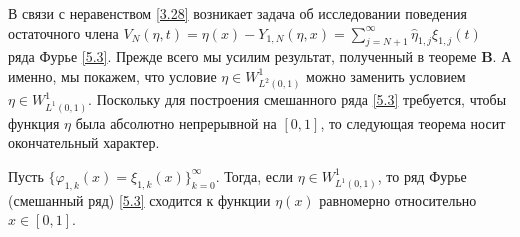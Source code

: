  В связи с неравенством \eqref{3.28} возникает задача об исследовании поведения остаточного члена $ V_N(\eta,t)=\eta(x)- Y_{1,N}(\eta,x)
=\sum\nolimits_{j=N+1}^\infty \hat \eta_{1,j}\xi_{1,j}(t)$  ряда Фурье \eqref{5.3}. Прежде всего мы усилим результат, полученный в теореме \textbf{ B}. А именно, мы покажем, что  условие $\eta\in W^1_{L^2(0,1)}$ можно заменить условием $\eta\in W^1_{L^1(0,1)}$. Поскольку для построения смешанного ряда \eqref{5.3} требуется, чтобы функция $\eta$ была абсолютно непрерывной на $[0,1]$, то следующая теорема носит окончательный характер.
\begin{theorem}
 Пусть $\{\varphi_{1,k}(x)=\xi_{1,k}(x)\}_{k=0}^\infty$. Тогда, если $\eta\in W^1_{L^1(0,1)}$, то ряд Фурье (смешанный ряд) \eqref{5.3} сходится к функции $\eta(x)$ равномерно относительно $x\in[0,1]$.
 \end{theorem}


